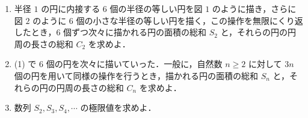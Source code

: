 \documentclass[a4paper,10pt]{ltjsarticle}
\begin{document}
\begin{oframed}
\begin{enumerate}
  \item 半径 $1$ の円に内接する $6$ 個の半径の等しい円を図 $1$ のように描き，さらに図 $2$ のように $6$ 個の小さな半径の等しい円を描く，この操作を無限にくり返したとき，$6$ 個ずつ次々に描かれる円の面積の総和 $S_2$ と，それらの円の円周の長さの総和 $C_2$ を求めよ．
  \item (1) で $6$ 個の円を次々に描いていった．一般に，自然数 $n \ge 2$ に対して $3n$ 個の円を用いて同様の操作を行うとき，描かれる円の面積の総和 $S_n$ と，それらの円の円周の長さの総和 $C_n$ を求めよ．
  \item 数列 $S_2, S_3, S_4, \cdots$ の極限値を求めよ．
\end{enumerate}

\begin{figure}[H]
  \centering
  \begin{subcaptionblock}{0.5\linewidth}
    \centering
{}
\end{subcaptionblock}\hfill
  \begin{subcaptionblock}{0.5\linewidth}
    \centering
{}
\end{subcaptionblock}\hfill
\end{figure}

\end{oframed}
\end{document}
